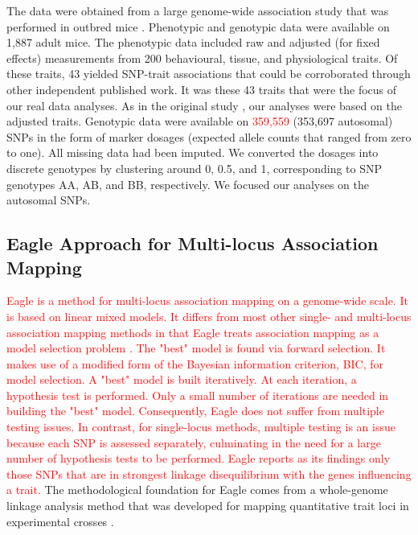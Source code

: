 \documentclass{article}
\begin{document}
The data were obtained from a large genome-wide association study that was performed in outbred mice \citep{nicod2016genome}. 
Phenotypic and genotypic data were available on 1,887 adult mice. 
The phenotypic data included raw and adjusted (for fixed effects) measurements from 200 behavioural, tissue, and physiological traits.  
Of these traits, 
43 yielded SNP-trait associations that could be corroborated through other independent published work. It was these 
43 traits that were the focus of our real data analyses. As in the original study  \citep{nicod2016genome}, our analyses 
were based on the adjusted traits.
Genotypic data were available on \textcolor{red}{359,559} (353,697 autosomal) SNPs in the 
form of marker dosages (expected allele counts that ranged from zero to one). All missing data had been imputed. 
We converted the dosages into discrete genotypes 
by clustering around 0, 0.5, and 1, corresponding to SNP genotypes AA, AB, and BB, respectively. 
We focused our analyses on the autosomal SNPs.




\subsection{Eagle Approach for Multi-locus Association Mapping}

\textcolor{red}{
Eagle is a method for multi-locus association mapping on a genome-wide scale. It is based on linear mixed models. It differs from most other single- and multi-locus association mapping methods in that Eagle treats association mapping as a model selection problem \citep{ball2001bayesian,broman2002model,yi2005bayesian}. 
The "best" model is found via forward selection. It makes use of a modified form of the Bayesian information criterion, BIC, for model selection.
A "best" model is built iteratively. At each iteration, a hypothesis test is performed. 
Only a small number of iterations are needed in building the "best" model.  Consequently, 
Eagle does not suffer from multiple testing issues.
In contrast,  for single-locus methods, multiple testing is an 
issue because each SNP is assessed separately, culminating in the need for a large number of hypothesis tests to be  performed. 
Eagle 
reports as its findings only those SNPs that are in strongest linkage disequilibrium with  the genes influencing a trait. }
The methodological foundation for Eagle comes from a whole-genome linkage analysis method that was developed for mapping 
quantitative trait loci in experimental crosses \citep{verbyla2007analysis}.
\end{document}
